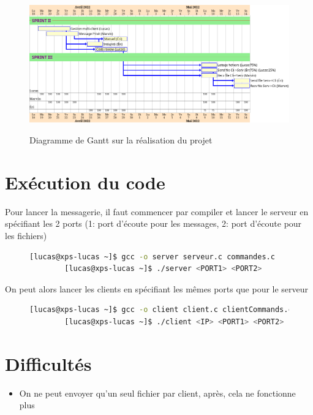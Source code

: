 \documentclass[a4paper,12pt]{article}
\begin{document}
\begin{figure}[h]
	\centering
	\hrulefill\\
	\vspace{0.4cm}
	\includegraphics[width=\linewidth]{gantt.png}\\
	\caption{Diagramme de Gantt sur la réalisation du projet}
	\label{fig:gantt}
	\hrulefill
\end{figure}
\pagebreak
\section{Exécution du code}
Pour lancer la messagerie, il faut commencer par compiler et lancer le serveur en spécifiant les 2 ports (1: port d'écoute pour les messages, 2: port d'écoute pour les fichiers)
\begin{figure}[h]
	\centering
	\vspace{-0.1cm}
	\begin{lstlisting}[language=bash, gobble=4]
		[lucas@xps-lucas ~]$ gcc -o server serveur.c commandes.c
		[lucas@xps-lucas ~]$ ./server <PORT1> <PORT2>
	\end{lstlisting}
\end{figure}

\noindent On peut alors lancer les clients en spécifiant les mêmes ports que pour le serveur
\begin{figure}[h]
	\centering
	\vspace{-0.2cm}
	\begin{lstlisting}[language=bash, gobble=4]
		[lucas@xps-lucas ~]$ gcc -o client client.c clientCommands.c
		[lucas@xps-lucas ~]$ ./client <IP> <PORT1> <PORT2>
	\end{lstlisting}
\end{figure}
\section{Difficultés}
\begin{itemize}
	\item On ne peut envoyer qu'un seul fichier par client, après, cela ne fonctionne plus
\end{itemize}
\end{document}
